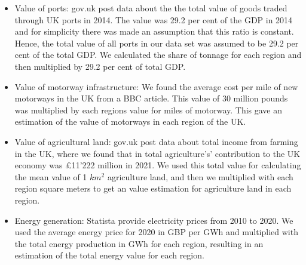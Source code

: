 \documentclass[10pt,a4paper]{article}
\begin{document}
\vspace{-.5cm}
\begin{itemize}
    \item Value of ports: gov.uk post data about the the total value of goods traded through UK ports in 2014. The value was 29.2 per cent of the GDP in 2014 and for simplicity there was made an assumption that this ratio is constant. Hence, the total value of all ports in our data set was assumed to be 29.2 per cent of the total GDP. We calculated the share of tonnage for each region and then multiplied by 29.2 per cent of total GDP. \cite{uka}
    \item Value of motorway infrastructure: We found the average cost per mile of new motorways in the UK from a BBC article. This value of 30 million pounds was multiplied by each regions value for miles of motorway. This gave an estimation of the value of motorways in each region of the UK. \cite{noauthor_uks_2011}
    \item Value of agricultural land: gov.uk post data about total income from farming in the UK, where we found that in total agriculture's' contribution to the UK economy was £11'222 million in 2021. We used this total value for calculating the mean value of 1 $km^2$ agriculture land, and then we multiplied with each region square meters to get an value estimation for agriculture land in each region. \cite{total}
    \item Energy generation: Statista provide electricity prices from 2010 to 2020. We used the average energy price for 2020 in GBP per GWh and multiplied with the total energy production in GWh for each region, resulting in an estimation of the total energy value for each region. \cite{ukb}
    
\end{itemize}
\end{document}
